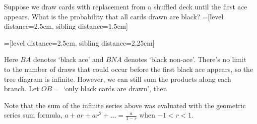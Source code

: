 \begin{examp}
Suppose we draw cards with replacement from a shuffled deck until the first ace appears. What is the probability that all cards drawn are black?
=[level distance=2.5cm, sibling distance=1.5cm]
\begin{center}
=[level distance=2.5cm, sibling distance=2.25cm]
\end{center}
\par
\noindent Here $BA$ denotes `black ace' and $BNA$ denotes `black non-ace'. There's no limit to the number of draws that could occur before the first black ace appears, so the tree diagram is infinite. However, we can still sum the products along each branch. Let $OB = $ `only black cards are drawn', then
\end{examp}
\par
Note that the sum of the infinite series above was evaluated with the geometric series sum formula, $a+ar+ar^2+ ... = \frac{a}{1-r}$ when $-1 < r < 1$.

